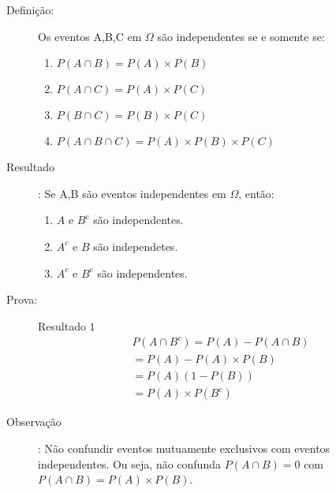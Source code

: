 \begin{description}
  \begin{description}
    \item [Definição:]Os eventos A,B,C em $\Omega$ são independentes se e somente se:

      \begin{enumerate}[label=(\alph*)]
        \item $P(A \cap B) = P(A)\times P(B)$ 

        \item $P(A \cap C) = P(A)\times P(C)$

        \item $P(B \cap C)= P(B)\times P(C)$

        \item $P(A \cap B \cap C)= P(A)\times P(B) \times P(C)$
      \end{enumerate}

    \item [Resultado]: Se A,B são eventos independentes em $\Omega$, então:

      \begin{enumerate}
        \item $A$ e $B^c$ são independentes.
        \item $A^c$ e $B$ são independetes.
        \item $A^c$ e $B^c$ são independentes.
      \end{enumerate}
      \begin{figure}[H]
        \centering
        
        \label{fig:19}
      \end{figure}
    \item[Prova:] Resultado $1$
      \begin{align*}
        P(A \cap B^{c})= P(A) - P(A \cap B)\\
        = P(A)-P(A)\times P(B)\\
        = P(A)(1-P(B))\\
        =P(A)\times P(B^{c})
      \end{align*}

    \item [Observação]: Não confundir eventos mutuamente exclusivos com eventos independentes. Ou seja, não confunda $P(A \cap B)  = 0$ com $ P(A \cap B) = P(A)\times P(B)$.


\end{description}
\end{description}
